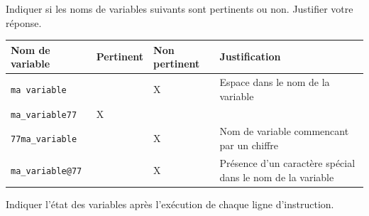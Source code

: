 \documentclass[a4paper,10pt]{report}
\renewcommand{\arraystretch}{1}  %
\def\ptsexoA{2}
\def\ptsexoB{3}
\begin{document}

\renewcommand{\labelitemi}{\textbullet} %


\pagestyle{DS_FP}          %
\NomPrenomNote{}


\exods{\ptsexoA}

Indiquer si les noms de variables suivants sont pertinents ou non. Justifier votre réponse.

\medskip

\renewcommand{\arraystretch}{3.5}
\begin{tabular}{|p{3cm}|p{3cm}|p{3cm}|p{7cm}|}
        \hline
        \textbf{Nom de variable} & \textbf{Pertinent} & \textbf{Non pertinent} &\textbf{Justification} \\ \hline
    \verb|ma variable| &&X& Espace dans le nom de la variable \\ \hline
    \verb|ma_variable77|&X&& \\ \hline
    \verb|77ma_variable|&&X&Nom de variable commencant par un chiffre \\ \hline
    \verb|ma_variable@77|&&X& Présence d'un caractère spécial dans le nom de la variable\\ \hline

    \end{tabular}



\bigskip

\exods{\ptsexoB}

    \renewcommand{\arraystretch}{1}

Indiquer l'état des variables après l'exécution de chaque ligne d'instruction.

\medskip
\end{document}
